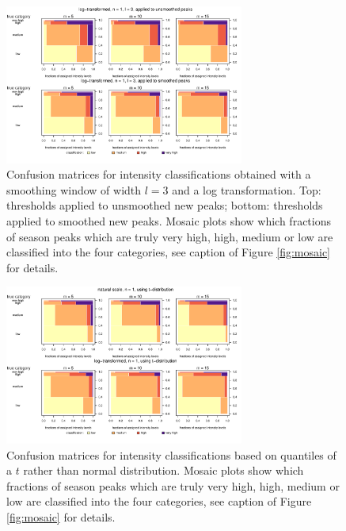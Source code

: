 \documentclass[12pt]{article}
\begin{document}
\begin{figure}[h!]
\begin{center}
\includegraphics[width=0.7\textwidth]{figure/mosaic_log_smoothed_fr.pdf}

\caption{Confusion matrices for intensity classifications obtained with a smoothing window of width $l = 3$ and a log transformation. Top: thresholds applied to unsmoothed new peaks; bottom: thresholds applied to smoothed new peaks. Mosaic plots show which fractions of season peaks which are truly very high, high, medium or low are classified into the four categories, see caption of Figure \ref{fig:mosaic} for details.}
\label{fig:mosaic_smoothing}
\end{center}
\end{figure}

\newpage


\begin{figure}[h!]
\begin{center}
\includegraphics[width=0.7\textwidth]{figure/mosaic_t_fr.pdf}

\caption{Confusion matrices for intensity classifications based on quantiles of a $t$ rather than normal distribution. Mosaic plots show which fractions of season peaks which are truly very high, high, medium or low are classified into the four categories, see caption of Figure \ref{fig:mosaic} for details.}
\label{fig:mosaic_t}
\end{center}
\end{figure}
\end{document}
